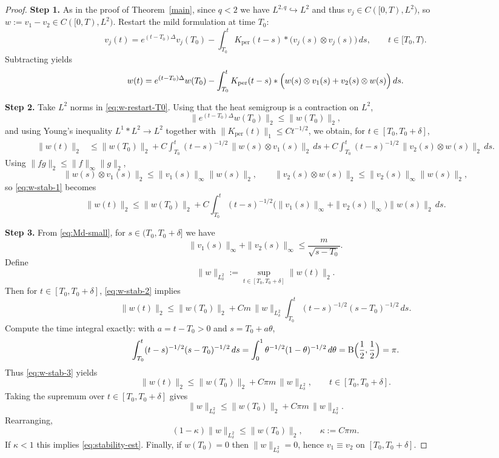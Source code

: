 \documentclass[12pt]{article}
\theoremstyle{remark}
\theoremstyle{remark}
\begin{document}
\begin{proof}
\textbf{Step 1.}
As in the proof of Theorem~\ref{main}, since $q<2$ we have
$L^{2,q}\hookrightarrow L^2$ and thus $v_j\in C([0,T),L^2)$, so $w:=v_1-v_2\in C([0,T),L^2)$.
Restart the mild formulation at time $T_0$:
\[
v_j(t)=e^{(t-T_0)\Delta}v_j(T_0)
-\int_{T_0}^{t} K_{\mathrm{per}}(t-s)*\bigl(v_j(s)\otimes v_j(s)\bigr)\,ds,
\qquad t\in[T_0,T).
\]
Subtracting yields
\begin{equation}\label{eq:w-restart-T0}
w(t)=e^{(t-T_0)\Delta}w(T_0)
-\int_{T_0}^{t} K_{\mathrm{per}}(t-s)*
\Bigl(w(s)\otimes v_1(s)+v_2(s)\otimes w(s)\Bigr)\,ds.
\end{equation}

\textbf{Step 2.}
Take $L^2$ norms in \eqref{eq:w-restart-T0}. Using that the heat semigroup is a contraction on $L^2$,
\[
\|e^{(t-T_0)\Delta}w(T_0)\|_2\le \|w(T_0)\|_2,
\]
and using Young's inequality $L^1*L^2\to L^2$ together with $\|K_{\mathrm{per}}(t)\|_{1}\le C t^{-1/2}$,
we obtain, for $t\in[T_0,T_0+\delta]$,
\begin{align}
\|w(t)\|_2
&\le \|w(T_0)\|_2
+ C\int_{T_0}^{t}(t-s)^{-1/2}\,\|w(s)\otimes v_1(s)\|_2\,ds
+ C\int_{T_0}^{t}(t-s)^{-1/2}\,\|v_2(s)\otimes w(s)\|_2\,ds.
\label{eq:w-stab-1}
\end{align}
Using $\|fg\|_2\le \|f\|_\infty\|g\|_2$,
\[
\|w(s)\otimes v_1(s)\|_2\le \|v_1(s)\|_\infty\|w(s)\|_2,\qquad
\|v_2(s)\otimes w(s)\|_2\le \|v_2(s)\|_\infty\|w(s)\|_2,
\]
so \eqref{eq:w-stab-1} becomes
\begin{equation}\label{eq:w-stab-2}
\|w(t)\|_2
\le \|w(T_0)\|_2
+ C\int_{T_0}^{t}(t-s)^{-1/2}\bigl(\|v_1(s)\|_\infty+\|v_2(s)\|_\infty\bigr)\|w(s)\|_2\,ds.
\end{equation}

\textbf{Step 3.}
From \eqref{eq:Md-small}, for $s\in(T_0,T_0+\delta]$ we have
\[
\|v_1(s)\|_\infty+\|v_2(s)\|_\infty
\le \frac{m}{\sqrt{s-T_0}}.
\]
Define
\[
\|w\|_{L^2_\delta}:=\sup_{t\in[T_0,T_0+\delta]}\|w(t)\|_2.
\]
Then for $t\in[T_0,T_0+\delta]$, \eqref{eq:w-stab-2} implies
\begin{equation}\label{eq:w-stab-3}
\|w(t)\|_2
\le \|w(T_0)\|_2
+ C m\,\|w\|_{L^2_\delta}\int_{T_0}^{t}(t-s)^{-1/2}(s-T_0)^{-1/2}\,ds.
\end{equation}
Compute the time integral exactly: with $a=t-T_0>0$ and $s=T_0+a\theta$,
\[
\int_{T_0}^{t}(t-s)^{-1/2}(s-T_0)^{-1/2}\,ds
=\int_0^1 \theta^{-1/2}(1-\theta)^{-1/2}\,d\theta
=\mathrm{B}\Bigl(\frac12,\frac12\Bigr)=\pi.
\]
Thus \eqref{eq:w-stab-3} yields
\[
\|w(t)\|_2\le \|w(T_0)\|_2 + C\pi m\,\|w\|_{L^2_\delta},
\qquad t\in[T_0,T_0+\delta].
\]
Taking the supremum over $t\in[T_0,T_0+\delta]$ gives
\[
\|w\|_{L^2_\delta}\le \|w(T_0)\|_2 + C\pi m\,\|w\|_{L^2_\delta}.
\]
Rearranging,
\[
(1-\kappa)\|w\|_{L^2_\delta}\le \|w(T_0)\|_2,\qquad \kappa:=C\pi m.
\]
If $\kappa<1$ this implies \eqref{eq:stability-est}. Finally, if $w(T_0)=0$ then
$\|w\|_{L^2_\delta}=0$, hence $v_1\equiv v_2$ on $[T_0,T_0+\delta]$.
\end{proof}
\end{document}
